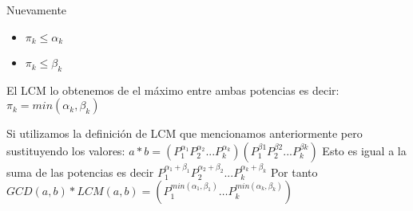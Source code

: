 Nuevamente
\begin{itemize}
    \item {$\pi_{k} \leq \alpha_{k}$}
    \item {$\pi_{k} \leq \beta_{k}$}
\end{itemize}
El LCM lo obtenemos de el máximo entre ambas potencias es decir: \newline
$\pi_{k} = min(\alpha_{k}, \beta_{k})$ \newline

Si utilizamos la definición de LCM que mencionamos anteriormente pero sustituyendo los valores: \newline
$a * b = (P_{1}^{\alpha_{1}}P_{2}^{\alpha_{2}}...P_{k}^{\alpha_{k}})(P_{1}^{\beta{1}}P_{2}^{\beta{2}}...P_{k}^{\beta{k}})$ \newline
Esto es igual a la suma de las potencias es decir 
$P_{1}^{\alpha_{1} + \beta_{1}}P_{2}^{\alpha_{2} + \beta_{2}}...P_{k}^{\alpha_{k} + \beta_{k}}$\newline
Por tanto \newline
$GCD(a, b)*LCM(a, b) = \left ( P_{1}^{ min(\alpha_{1}, \beta_{1})} \dots P_{k}^{ min(\alpha_{k}, \beta_{k}) }  \right )$